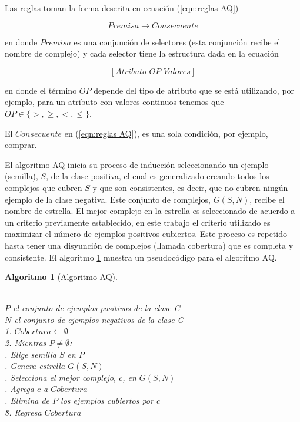 \documentclass[12pt]{scrbook}
\theoremstyle{break}
\theoremstyle{break}
\newtheorem{algoritmo}{Algoritmo}[chapter]
\begin{document}
Las reglas toman la forma descrita en ecuación (\ref{eqn:reglas AQ})

\begin{equation} \label{eqn:reglas AQ}
Premisa \rightarrow Consecuente
\end{equation}

en donde $Premisa$ es una conjunción de selectores (esta conjunción recibe el nombre de complejo) y cada selector tiene la estructura dada en la ecuación 

\begin{equation} \label{eqn:condicion AQ}
\left[Atributo\,\, OP\,\, Valores \right]
\end{equation}

en donde el término $OP$ depende del tipo de atributo que se está utilizando, por ejemplo, para un atributo con valores continuos tenemos que $OP \in \{>, \geq, <, \leq\}$.

El $Consecuente$ en (\ref{eqn:reglas AQ}), es una sola condición, por ejemplo, comprar.

El algoritmo AQ inicia su proceso de inducción seleccionando un ejemplo (semilla), $S$, de la clase positiva, el cual es generalizado creando todos los complejos que cubren $S$ y que son consistentes, es decir, que no cubren ningún ejemplo de la clase negativa. Este conjunto de complejos, $G(S,N)$, recibe el nombre de estrella. El mejor complejo en la estrella es seleccionado de acuerdo a un criterio previamente establecido, en este trabajo el criterio utilizado es maximizar el número de ejemplos positivos cubiertos. Este proceso es repetido hasta tener una disyunción de complejos (llamada cobertura) que es completa y consistente. El algoritmo \ref{algo:AQ} muestra un pseudocódigo para el algoritmo AQ.

\begin{algoritmo}[Algoritmo AQ]
\begin{tabbing}
\\$P$ el conjunto de ejemplos positivos de la clase C
\\$N$ el conjunto de ejemplos negativos de la clase C\\
1. \=$Cobertura\leftarrow \emptyset $ \\
2. Mientras $P \neq \emptyset$:\\
 . Elige semilla $S$ en $P$\\
 . Genera estrella $G(S,N)$\\
 . Selecciona el mejor complejo, $c$, en $G(S,N)$\\
 . Agrega $c$ a $Cobertura$\\
 . Elimina de $P$ los ejemplos cubiertos por $c$\\
\=8. Regresa $Cobertura$
\end{tabbing}
\label{algo:AQ}
\end{algoritmo}
\end{document}

